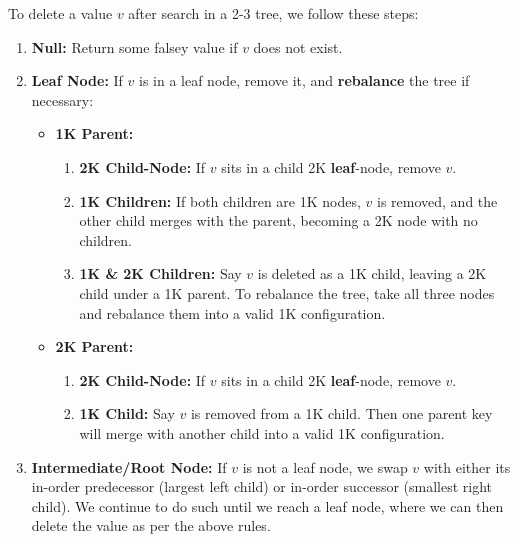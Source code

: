 \begin{Def}

\label{def:2-3_tree_delete}

To delete a value $v$ after search in a 2-3 tree, we follow these steps:
    \begin{enumerate}
        \item \textbf{Null:} Return some falsey value if $v$ does not exist.
        \item \textbf{Leaf Node:} If $v$ is in a leaf node, remove it, and \textbf{rebalance} the tree if necessary:
        \begin{itemize}
            \item \textbf{1K Parent:}
            \begin{enumerate}
            \item \textbf{2K Child-Node:} If $v$ sits in a child 2K \textbf{leaf}-node, remove $v$.
            \item \textbf{1K Children:} If both children are 1K nodes, $v$ is removed, and 
            the other child merges with the parent, becoming a 2K node with no children.
            \item \textbf{1K \& 2K Children:} Say $v$ is deleted as a 1K child, leaving a 2K child under a 1K parent.
            To rebalance the tree, take all three nodes and rebalance them into a valid 1K configuration.
        \end{enumerate}
        \item \textbf{2K Parent:}
            \begin{enumerate}
            \item \textbf{2K Child-Node:} If $v$ sits in a child 2K \textbf{leaf}-node, remove $v$.
            \item \textbf{1K Child:} Say $v$ is removed from a 1K child. Then
            one parent key will merge with another child into a valid 1K configuration.
            \end{enumerate}
        \end{itemize}
        \item \textbf{Intermediate/Root Node:} If $v$ is not a leaf node,
        we swap $v$ with either its in-order predecessor (largest left child) or in-order successor (smallest right child).
        We continue to do such until we reach a leaf node, where we can then delete the value as per the above rules.
    \end{enumerate}
        
\end{Def}

\newpage